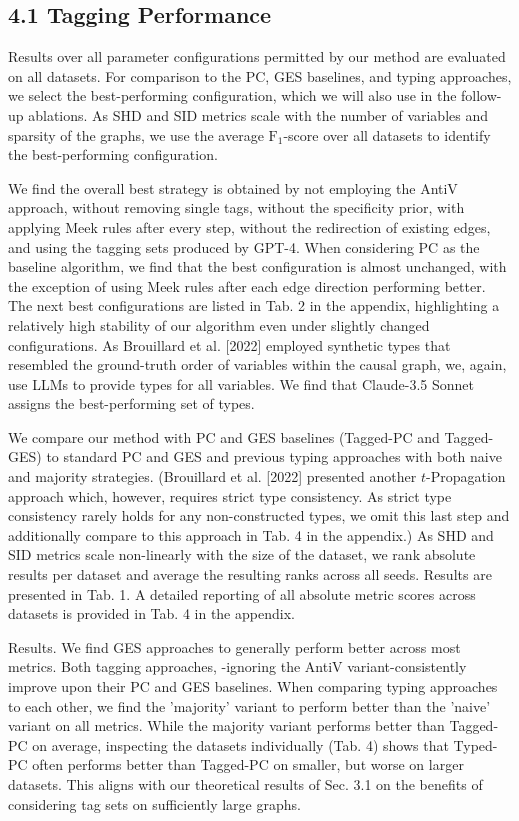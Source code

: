 \documentclass[10pt]{article}
\begin{document}
\subsection*{4.1 Tagging Performance}
Results over all parameter configurations permitted by our method are evaluated on all datasets. For comparison to the PC, GES baselines, and typing approaches, we select the best-performing configuration, which we will also use in the follow-up ablations. As SHD and SID metrics scale with the number of variables and sparsity of the graphs, we use the average $\mathrm{F}_{1}$-score over all datasets to identify the best-performing configuration.

We find the overall best strategy is obtained by not employing the AntiV approach, without removing single tags, without the specificity prior, with applying Meek rules after every step, without the redirection of existing edges, and using the tagging sets produced by GPT-4. When considering PC as the baseline algorithm, we find that the best configuration is almost unchanged, with the exception of using Meek rules after each edge direction performing better. The next best configurations are listed in Tab. 2 in the appendix, highlighting a relatively high stability of our algorithm even under slightly changed configurations. As Brouillard et al. [2022] employed synthetic types that resembled the ground-truth order of variables within the causal graph, we, again, use LLMs to provide types for all variables. We find that Claude-3.5 Sonnet assigns the best-performing set of types.

We compare our method with PC and GES baselines (Tagged-PC and Tagged-GES) to standard PC and GES and previous typing approaches with both naive and majority strategies. (Brouillard et al. [2022] presented another $t$-Propagation approach which, however, requires strict type consistency. As strict type consistency rarely holds for any non-constructed types, we omit this last step and additionally compare to this approach in Tab. 4 in the appendix.) As SHD and SID metrics scale non-linearly with the size of the dataset, we rank absolute results per dataset and average the resulting ranks across all seeds. Results are presented in Tab. 1. A detailed reporting of all absolute metric scores across datasets is provided in Tab. 4 in the appendix.

Results. We find GES approaches to generally perform better across most metrics. Both tagging approaches, -ignoring the AntiV variant-consistently improve upon their PC and GES baselines. When comparing typing approaches to each other, we find the 'majority' variant to perform better than the 'naive' variant on all metrics. While the majority variant performs better than Tagged-PC on average, inspecting the datasets individually (Tab. 4) shows that Typed-PC often performs better than Tagged-PC on smaller, but worse on larger datasets. This aligns with our theoretical results of Sec. 3.1 on the benefits of considering tag sets on sufficiently large graphs.
\end{document}
